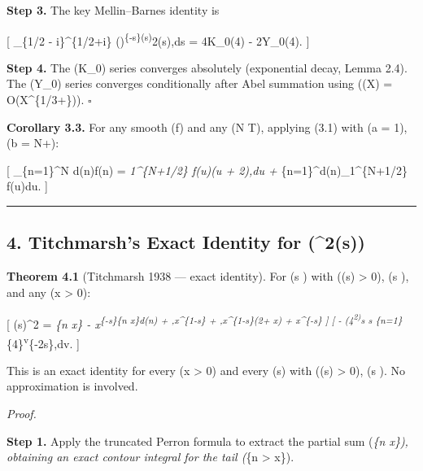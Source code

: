 \documentclass[
]{article}
\begin{document}
\textbf{Step 3.} The key Mellin--Barnes identity is

{[} \int\_\{1/2 - i\infty\}\^{}\{1/2+i\infty\}
\left(\right)\textsuperscript{\{-s\}\Gamma(s)}2\cos(\pi s),ds
= 4K\_0(4\pi{}) - 2\pi Y\_0(4\pi{}).  {]}

\textbf{Step 4.} The (K\_0) series converges absolutely (exponential
decay, Lemma 2.4). The (Y\_0) series converges conditionally after Abel
summation using (\Delta(X) = O(X\^{}\{1/3+\varepsilon\})). \(\square\)

\textbf{Corollary 3.3.} For any smooth (f) and any (N \asymp T),
applying (3.1) with (a = 1), (b = N+):

{[} \sum\_\{n=1\}\^{}N d(n)f(n) = \int\emph{1\^{}\{N+1/2\} f(u)(\log u +
2\gamma),du + \sum}\{n=1\}\^{}\infty d(n)\int\_1\^{}\{N+1/2\}
f(u)du.
 {]}

\begin{center}\rule{0.5\linewidth}{0.5pt}\end{center}

\subsection{\texorpdfstring{4. Titchmarsh's Exact Identity for
(\zeta\^{}2(s))}{4. Titchmarsh's Exact Identity for (\^{}2(s))}}\label{titchmarshs-exact-identity-for-2s}

\textbf{Theorem 4.1} (Titchmarsh 1938 --- exact identity). For (s
\in {}) with ((s) \textgreater{} 0), (s ), and
any (x \textgreater{} 0):

{[} \zeta(s)\^{}2 = \sum\emph{\{n \le x\} -
x\textsuperscript{\{-s\}\sum\emph{\{n \le x\}d(n) +
,x\^{}\{1-s\} +
,x\^{}\{1-s\}(2\gamma + \log x) + x\^{}\{-s\}
{]} {[} - (4\pi\textsuperscript{2)}s s
\sum}\{n=1\}}\infty {}\int}\{4\pi{}\}\textsuperscript{\infty {}v}\{-2s\},dv.
 {]}

This is an exact identity for every (x \textgreater{} 0) and every (s)
with ((s) \textgreater{} 0), (s ). No approximation is
involved.

\emph{Proof.}

\textbf{Step 1.} Apply the truncated Perron formula to extract the
partial sum (\sum\emph{\{n \le x\}), obtaining an exact contour integral
for the tail (\sum}\{n \textgreater{} x\}).
\end{document}
